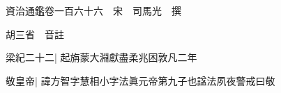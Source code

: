 






























































資治通鑑卷一百六十六　宋　司馬光　撰

胡三省　音註

梁紀二十二|{
	起旃蒙大淵獻盡柔兆困敦凡二年}


敬皇帝|{
	諱方智字慧相小字法眞元帝第九子也諡法夙夜警戒曰敬}


